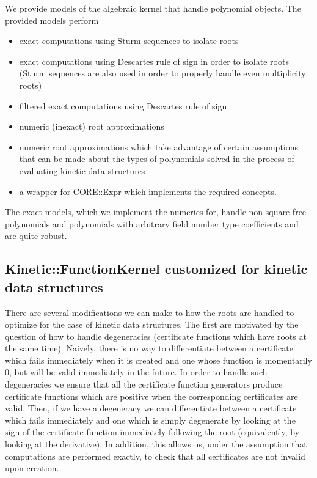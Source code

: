 We provide models of the algebraic kernel that handle polynomial
 objects. The provided models perform
\begin{itemize}
\item exact computations using Sturm sequences to isolate roots
\item exact computations using Descartes rule of sign in order to
  isolate roots (Sturm sequences are also used in order to properly
  handle even multiplicity roots)
\item filtered exact computations using Descartes rule of sign
\item numeric (inexact) root approximations
\item numeric root approximations which take advantage of certain
  assumptions that can be made about the types of polynomials solved
  in the process of evaluating kinetic data structures
\item a wrapper for CORE::Expr which implements the required
  concepts.
\end{itemize}
The exact models, which we implement the numerics for, handle
non-square-free polynomials and polynomials with arbitrary field
number type coefficients and are quite robust.


\subsection{Kinetic::FunctionKernel customized for kinetic data structures}

There are several modifications we can make to how the roots are
handled to optimize for the case of kinetic data structures.  The
first are motivated by the question of how to handle degeneracies
(certificate functions which have roots at the same time).  Naively,
there is no way to differentiate between a certificate which fails
immediately when it is created and one whose function is momentarily
0, but will be valid immediately in the future. In order to handle
such degeneracies we ensure that all the certificate function
generators produce certificate functions which are positive when the
corresponding certificates are valid.  Then, if we have a degeneracy
we can differentiate between a certificate which fails immediately and
one which is simply degenerate by looking at the sign of the
certificate function immediately following the root (equivalently, by
looking at the derivative). In addition, this allows us, under the
assumption that computations are performed exactly, to check that all
certificates are not invalid upon creation.

